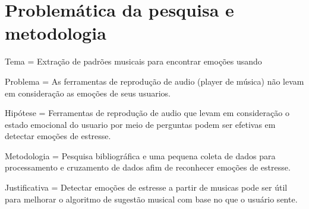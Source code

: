 \chapter{Problemática da pesquisa e metodologia}

Tema = Extração de padrões musicais para encontrar emoções usando 

Problema = As ferramentas de reprodução de audio (player de música) não levam em consideração as emoções de seus usuarios.

Hipótese = Ferramentas de reprodução de audio que levam em consideração o estado emocional do usuario por meio de perguntas podem ser efetivas em detectar emoções de estresse.

Metodologia = Pesquisa bibliográfica e uma pequena coleta de dados para processamento e cruzamento de dados afim de reconhecer emoções de estresse.

Justificativa = Detectar emoções de estresse a partir de musicas pode ser útil para melhorar o algoritmo de sugestão musical com base no que o usuário sente.


